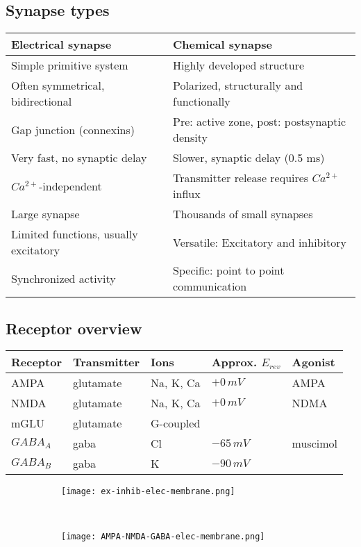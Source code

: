 \documentclass[main]{subfiles}
\begin{document}
\subsection{Synapse types}
\begin{tabular}{|l|l|}
	\hline
	\textbf{Electrical synapse} & \textbf{Chemical synapse}\\\hline
	Simple primitive system & Highly developed structure\\\hline
	Often symmetrical, bidirectional & Polarized, structurally and functionally\\\hline
	Gap junction (connexins) & Pre: active zone, post: postsynaptic density\\\hline
	Very fast, no synaptic delay & Slower, synaptic delay (0.5 ms)\\\hline
	$Ca^{2+}$-independent & Transmitter release requires $Ca^{2+}$ influx\\\hline
	Large synapse & Thousands of small synapses\\\hline
	Limited functions, usually excitatory & Versatile: Excitatory and inhibitory\\\hline
	Synchronized activity & Specific: point to point communication\\\hline
\end{tabular}

\subsection{Receptor overview}
\begin{tabular}{|l|l|l|l|l|}
	\hline
	\textbf{Receptor} & \textbf{Transmitter} & \textbf{Ions} & \textbf{Approx. $E_{rev}$} & \textbf{Agonist}\\\hline
	AMPA & glutamate & Na, K, Ca & $+0\,mV$ & AMPA\\\hline
	NMDA & glutamate & Na, K, Ca & $+0\,mV$ & NDMA\\\hline
	mGLU & glutamate & G-coupled & & \\\hline
	$GABA_A$ & gaba & Cl & $-65\,mV$ & muscimol\\\hline
	$GABA_B$ & gaba & K & $-90\,mV$ & \\\hline
\end{tabular}

\begin{figure}[H]
	\centering
	\begin{subfigure}[b]{0.5\textwidth}
    	\centering
		\texttt{[image: ex-inhib-elec-membrane.png]}
	\end{subfigure}%
	~
	\begin{subfigure}[b]{0.5\textwidth}
		\centering
		\texttt{[image: AMPA-NMDA-GABA-elec-membrane.png]}
	\end{subfigure}
\end{figure}
\end{document}
